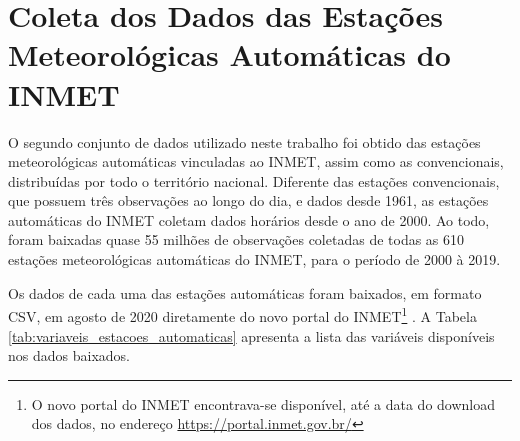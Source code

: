 \section{Coleta dos Dados das Estações Meteorológicas Automáticas do INMET}

O segundo conjunto de dados utilizado neste trabalho foi obtido das estações meteorológicas automáticas vinculadas ao INMET, assim como as convencionais, distribuídas por todo o território nacional. Diferente das estações convencionais, que possuem três observações ao longo do dia, e dados desde 1961, as estações automáticas do INMET coletam dados horários desde o ano de 2000. Ao todo, foram baixadas quase 55 milhões de observações coletadas de todas as 610 estações meteorológicas automáticas do INMET, para o período de 2000 à 2019.

Os dados de cada uma das estações automáticas foram baixados, em formato CSV, em agosto de 2020 diretamente do novo portal do INMET\footnote{O novo portal do INMET encontrava-se disponível, até a data do download dos dados, no endereço \href{https://portal.inmet.gov.br/}{https://portal.inmet.gov.br/}} . A Tabela  \ref{tab:variaveis_estacoes_automaticas} apresenta a lista das variáveis disponíveis nos dados baixados.

